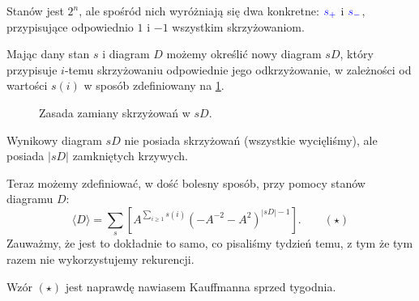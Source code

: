 \documentclass{article}
\begin{document}
Stanów jest $2^n$, ale spośród nich wyróżniają się dwa konkretne: $\color{blue}s_+$ i $\color{blue}s_-$, przypisujące odpowiednio $1$ i $-1$ wszystkim skrzyżowaniom.

Mając dany stan $s$ i diagram $D$ możemy określić nowy diagram $sD$, który przypisuje $i$-temu skrzyżowaniu odpowiednie jego odkrzyżowanie, w zależności od wartości $s(i)$ w sposób zdefiniowany na \cref{stan od diagramu}. 

\begin{figure}[h]\centering 
  \caption{\label{stan od diagramu}Zasada zamiany skrzyżowań w $sD$.}
\end{figure}
Wynikowy diagram $sD$ nie posiada skrzyżowań (wszystkie wycięliśmy), ale posiada $|sD|$ zamkniętych krzywych. 

Teraz możemy zdefiniować, w dość bolesny sposób,  przy pomocy stanów diagramu $D$:
$$\langle D\rangle = \sum_s\left[A^{\sum_{i\geq 1} s(i)}(-A^{-2}-A^2)^{|sD|-1}\right].\quad \quad (\star)$$
Zauważmy, że jest to dokładnie to samo, co pisaliśmy tydzień temu, z tym że tym razem nie wykorzystujemy rekurencji.

\begin{fuck}
  Wzór $(\star)$ jest naprawdę nawiasem Kauffmanna sprzed tygodnia.
\end{fuck}


\def\iksik{\tikz[baseline=.1ex]{
  \draw[thick] (0,0)--(1.5ex, 1.5ex);
  \fill[white] (0.75ex, 0.75ex) circle (2pt);
  \draw[thick] (0,1.5ex)--(1.5ex, 0);
  }
}
\end{document}

